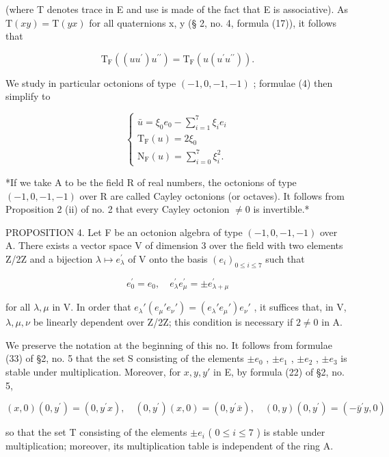 (where T denotes trace in E and use is made of the fact that E is associative). As \(\mathrm{T}(xy) = \mathrm{T}(yx)\) for all quaternions x, y (§ 2, no. 4, formula (17)), it follows that

\[
\mathrm{T} _ {\mathrm{F}} ((u u ^ {\prime}) u ^ {\prime \prime}) = \mathrm{T} _ {\mathrm{F}} (u (u ^ {\prime} u ^ {\prime \prime})).\tag{5}
\]

We study in particular octonions of type \((-1, 0, -1, -1)\) ; formulae (4) then simplify to

\[
\left\{ \begin{array}{c} {\bar {u}} = \xi_ {0} e _ {0} - \sum_ {i = 1} ^ {7} \xi_ {i} e _ {i} \\ \mathrm{T} _ {\mathrm{F}} (u) = 2 \xi_ {0} \\ \mathrm{N} _ {\mathrm{F}} (u) = \sum_ {i = 0} ^ {7} \xi_ {i} ^ {2}. \end{array} \right.\tag{6}
\]

*If we take A to be the field R of real numbers, the octonions of type \((-1,0,-1,-1)\) over R are called Cayley octonions (or octaves). It follows from Proposition 2 (ii) of no. 2 that every Cayley octonion \(\neq0\) is invertible.*

PROPOSITION 4. Let F be an octonion algebra of type \((-1,0,-1,-1)\) over A. There exists a vector space V of dimension 3 over the field with two elements Z/2Z and a bijection \(\lambda\mapsto e_{\lambda}^{\prime}\) of V onto the basis \((e_{i})_{0\leq i\leq7}\) such that

\[
e _ {0} ^ {\prime} = e _ {0}, \quad e _ {\lambda} ^ {\prime} e _ {\mu} ^ {\prime} = \pm e _ {\lambda + \mu} ^ {\prime}\tag{7}
\]

for all \(\lambda, \mu\) in V. In order that \(e_{\lambda}'(e_{\mu}'e_{\nu}') = (e_{\lambda}'e_{\mu}')e_{\nu}'\) , it suffices that, in V, \(\lambda, \mu, \nu\) be linearly dependent over Z/2Z; this condition is necessary if \(2 \neq 0\) in A.

We preserve the notation at the beginning of this no. It follows from formulae (33) of §2, no. 5 that the set S consisting of the elements \(\pm e_0\) , \(\pm e_1\) , \(\pm e_2\) , \(\pm e_3\) is stable under multiplication. Moreover, for \(x, y, y'\) in E, by formula (22) of §2, no. 5,

\[
(x, 0) (0, y ^ {\prime}) = (0, y ^ {\prime} x), \quad (0, y ^ {\prime}) (x, 0) = (0, y ^ {\prime} \bar {x}), \quad (0, y) (0, y ^ {\prime}) = (- \bar {y} ^ {\prime} y, 0)\tag{8}
\]

so that the set T consisting of the elements \(\pm e_{i}\) ( \(0 \leqslant i \leqslant 7\) ) is stable under multiplication; moreover, its multiplication table is independent of the ring A.

